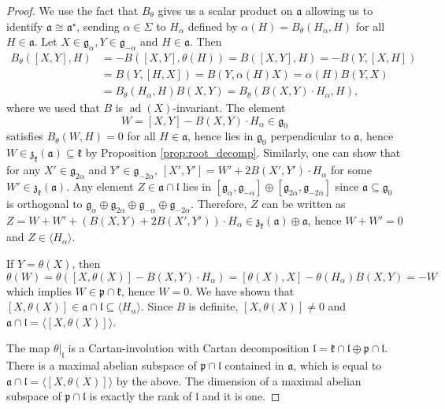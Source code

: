 \documentclass[12pt]{amsart}
\newcommand{\frakg}{\mathfrak{g}}
\newcommand{\frakp}{\mathfrak{p}}
\newcommand{\frakk}{\mathfrak{k}}
\newcommand{\fraka}{\mathfrak{a}}
\newcommand{\frakl}{\mathfrak{l}}
\numberwithin{equation}{section}
\theoremstyle{remark} %
\begin{document}
\begin{proof}
	We use the fact that $B_\theta$ gives us a scalar product on $\fraka$ allowing us to identify $\fraka \cong \fraka^\star$, sending $\alpha \in \Sigma$ to $H_\alpha$ defined by $\alpha(H)=B_\theta(H_\alpha,H)$ for all $H \in \fraka$. Let $X\in \frakg_\alpha, Y \in \frakg_{-\alpha}$ and $H \in \fraka$. Then
	\begin{align*}
		B_\theta([X,Y],H) & = -B([X,Y],\theta(H)) = B([X,Y], H) = - B(Y,[X,H])  \\
		&= B(Y,[H,X]) = B(Y,\alpha(H)X) = \alpha(H)B(Y,X) \\
		&=  B_\theta(H_\alpha, H)B(X,Y) = B_\theta(B(X,Y) \cdot H_\alpha ,H),
	\end{align*}
	where we used that $B$ is $\operatorname{ad}(X)$-invariant.
	The element 
	$$
	W = [X,Y]- B(X,Y) \cdot H_\alpha  \in \frakg_0
	$$
	satisfies $B_\theta(W,H)=0$ for all $H \in \fraka$, hence lies in $\frakg_0$ perpendicular to $\fraka$, hence $W \in \mathfrak{z}_\frakk(\fraka) \subseteq \frakk$ by Proposition \ref{prop:root_decomp}. Similarly, one can show that for any $X' \in \frakg_{2\alpha}$ and $Y' \in \frakg_{-2\alpha}$, $[X',Y'] =W' + 2B(X',Y') \cdot H_\alpha$ for some $W' \in \mathfrak{z}_\frakk(\fraka)$. Any element $Z\in \fraka \cap \frakl$  lies in $[\frakg_\alpha , \frakg_{-\alpha} ] \oplus [ \frakg_{2\alpha} , \frakg_{-2\alpha}]$ since $\fraka \subseteq \frakg_0$ is orthogonal to $\frakg_\alpha \oplus \frakg_{2\alpha} \oplus \frakg_{-\alpha} \oplus \frakg_{-2\alpha}$. Therefore, $Z$ can be written as $Z=W+W'+ (B(X,Y)+2B(X',Y')) \cdot H_\alpha  \in \mathfrak{z}_\frakk(\fraka) \oplus \fraka$, hence $W+W'=0$ and $Z \in \langle H_\alpha \rangle$.
	
	If $Y=\theta(X)$, then 
	$$
	\theta(W)=\theta([X,\theta(X)]-B(X,Y)\cdot H_\alpha ) = [\theta(X),X]-\theta(H_\alpha) B(X,Y) = - W
	$$ 
	which implies $W \in \frakp \cap \frakk$, hence $W=0$. We have shown that $[X,\theta(X)] \in \fraka \cap \frakl \subseteq \langle H_\alpha \rangle$. Since $B$ is definite, $[X,\theta(X)] \neq 0$ and $\fraka \cap \frakl = \langle [ X, \theta(X)] \rangle$.
	
	The map $\theta|_{\frakl}$ is a Cartan-involution with Cartan decomposition $\frakl = \frakk\cap \frakl \oplus \frakp \cap \frakl$. There is a maximal abelian subspace of $\frakp \cap \frakl$ contained in $\fraka$, which is equal to $\fraka \cap \frakl = \langle [X,\theta(X)] \rangle$ by the above. The dimension of a maximal abelian subspace of $\frakp \cap \frakl$ is exactly the rank of $\frakl$ and it is one. 
\end{proof}
\end{document}
